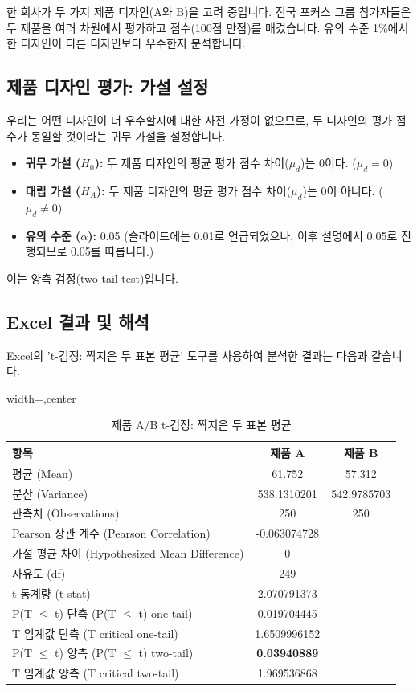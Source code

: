 \documentclass[11pt,a4paper]{article}
\theoremstyle{definition}
\begin{document}
\begin{examplebox}[title=시나리오: 제품 디자인 평가]
한 회사가 두 가지 제품 디자인(A와 B)을 고려 중입니다. 전국 포커스 그룹 참가자들은 두 제품을 여러 차원에서 평가하고 점수(100점 만점)를 매겼습니다. 유의 수준 1\%에서 한 디자인이 다른 디자인보다 우수한지 분석합니다.
\end{examplebox}

\subsection{제품 디자인 평가: 가설 설정}
우리는 어떤 디자인이 더 우수할지에 대한 사전 가정이 없으므로, 두 디자인의 평가 점수가 동일할 것이라는 귀무 가설을 설정합니다.
\begin{itemize}
    \item \textbf{귀무 가설 ($H_0$):} 두 제품 디자인의 평균 평가 점수 차이($\mu_d$)는 0이다. ($\mu_d = 0$)
    \item \textbf{대립 가설 ($H_A$):} 두 제품 디자인의 평균 평가 점수 차이($\mu_d$)는 0이 아니다. ($\mu_d \ne 0$)
    \item \textbf{유의 수준 ($\alpha$):} 0.05 (슬라이드에는 0.01로 언급되었으나, 이후 설명에서 0.05로 진행되므로 0.05를 따릅니다.)
\end{itemize}
이는 양측 검정(two-tail test)입니다.

\subsection{Excel 결과 및 해석}
Excel의 't-검정: 짝지은 두 표본 평균' 도구를 사용하여 분석한 결과는 다음과 같습니다.

\begin{table}[h!]
\caption{제품 A/B t-검정: 짝지은 두 표본 평균}
\label{tab:product_ttest_paired}
\centering
\begin{adjustbox}{width=\textwidth,center}
\begin{tabular}{lcc}
\toprule
\textbf{항목} & \textbf{제품 A} & \textbf{제품 B} \\
\midrule
평균 (Mean) & 61.752 & 57.312 \\
분산 (Variance) & 538.1310201 & 542.9785703 \\
관측치 (Observations) & 250 & 250 \\
Pearson 상관 계수 (Pearson Correlation) & -0.063074728 & \\
가설 평균 차이 (Hypothesized Mean Difference) & 0 & \\
자유도 (df) & 249 & \\
t-통계량 (t-stat) & 2.070791373 & \\
P(T $\le$ t) 단측 (P(T $\le$ t) one-tail) & 0.019704445 & \\
T 임계값 단측 (T critical one-tail) & 1.6509996152 & \\
P(T $\le$ t) 양측 (P(T $\le$ t) two-tail) & \textbf{0.03940889} & \\
T 임계값 양측 (T critical two-tail) & 1.969536868 & \\
\bottomrule
\end{tabular}
\end{adjustbox}
\end{table}
\end{document}
